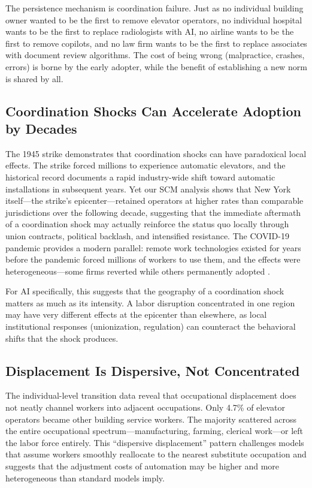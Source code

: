 \documentclass[12pt]{article}
\begin{document}
The persistence mechanism is coordination failure. Just as no individual building owner wanted to be the first to remove elevator operators, no individual hospital wants to be the first to replace radiologists with AI, no airline wants to be the first to remove copilots, and no law firm wants to be the first to replace associates with document review algorithms. The cost of being wrong (malpractice, crashes, errors) is borne by the early adopter, while the benefit of establishing a new norm is shared by all.

\subsection{Coordination Shocks Can Accelerate Adoption by Decades}

The 1945 strike demonstrates that coordination shocks can have paradoxical local effects. The strike forced millions to experience automatic elevators, and the historical record documents a rapid industry-wide shift toward automatic installations in subsequent years. Yet our SCM analysis shows that New York itself---the strike's epicenter---retained operators at higher rates than comparable jurisdictions over the following decade, suggesting that the immediate aftermath of a coordination shock may actually reinforce the status quo locally through union contracts, political backlash, and intensified resistance. The COVID-19 pandemic provides a modern parallel: remote work technologies existed for years before the pandemic forced millions of workers to use them, and the effects were heterogeneous---some firms reverted while others permanently adopted \citep{seamans2024}.

For AI specifically, this suggests that the geography of a coordination shock matters as much as its intensity. A labor disruption concentrated in one region may have very different effects at the epicenter than elsewhere, as local institutional responses (unionization, regulation) can counteract the behavioral shifts that the shock produces.

\subsection{Displacement Is Dispersive, Not Concentrated}

The individual-level transition data reveal that occupational displacement does not neatly channel workers into adjacent occupations. Only 4.7\% of elevator operators became other building service workers. The majority scattered across the entire occupational spectrum---manufacturing, farming, clerical work---or left the labor force entirely. This ``dispersive displacement'' pattern challenges models that assume workers smoothly reallocate to the nearest substitute occupation and suggests that the adjustment costs of automation may be higher and more heterogeneous than standard models imply.
\end{document}
